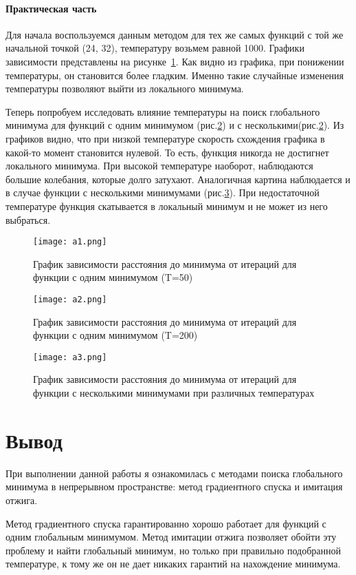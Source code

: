 \documentclass[14pt]{matmex-diploma-custom}
\begin{document}
\clearpage
\paragraph{Практическая часть}
Для начала воспользуемся данным методом для тех же самых функций с той же начальной точкой (24, 32), температуру возьмем равной 1000.
Графики зависимости представлены на рисунке~\ref{an1}. Как видно из графика, при понижении температуры, он становится более гладким. Именно такие случайные изменения температуры позволяют выйти из локального минимума.

\clearpage

Теперь попробуем исследовать влияние температуры на поиск глобального минимума для функций с одним минимумом 
(рис.\ref{an2}) и с несколькими(рис.\ref{an2}). 
Из графиков видно, что при низкой температуре скорость схождения графика в какой-то момент становится нулевой. 
То есть, функция никогда не достигнет локального минимума.
При высокой температуре наоборот, наблюдаются большие колебания, которые долго затухают.
Аналогичная картина наблюдается и в случае функции с несколькими минимумами (рис.\ref{an3}). 
При недостаточной температуре функция скатывается в локальный минимум и не может из него выбраться. 

\begin{figure}[h]
    \center
    \texttt{[image: a1.png]}
    \caption{График зависимости расстояния до минимума от итераций для функции с одним минимумом (T=50)}
    \label{an1}    
\end{figure}
\begin{figure}[h]
    \center
    \texttt{[image: a2.png]}
    \caption{График зависимости расстояния до минимума от итераций для функции с одним минимумом (T=200)}
    \label{an2}    
\end{figure}
\begin{figure}[h]
    \center
    \texttt{[image: a3.png]}
    \caption{График зависимости расстояния до минимума от итераций для функции с несколькими минимумами при различных температурах}
    \label{an3}    
\end{figure}

\clearpage
\section*{Вывод}
При выполнении данной работы я ознакомилась с методами поиска глобального
минимума в непрерывном пространстве: метод градиентного спуска и имитация отжига.
\par
Метод градиентного спуска гарантированно хорошо работает для функций с одним глобальным минимумом. 
Метод имитации отжига позволяет обойти эту проблему и найти глобальный минимум, но только при правильно подобранной температуре, к тому же он не дает никаких гарантий на нахождение минимума.
\end{document}
